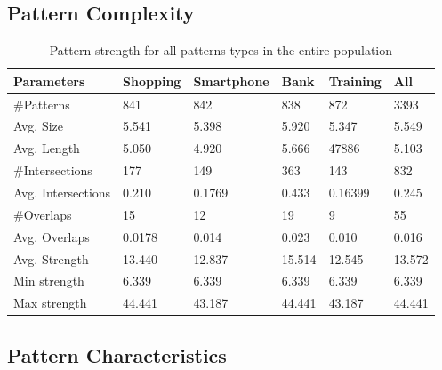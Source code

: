 	\subsection{Pattern Complexity}

		\begin{table}[H]
      \begin{tabular}{l || l | l | l | l || l}
        \hline
        {\bf Parameters} & {\bf Shopping} & {\bf Smartphone} & {\bf Bank} & {\bf Training} & {\bf All} \\ \hline
        \#Patterns & 841 & 842 & 838 & 872 & 3393 \\
        Avg. Size & 5.541 & 5.398 & 5.920 & 5.347 & 5.549 \\ 
        Avg. Length & 5.050 & 4.920 & 5.666 & 47886 & 5.103 \\
        \#Intersections & 177 & 149 & 363 & 143 & 832 \\
        Avg. Intersections & 0.210 & 0.1769 & 0.433 & 0.16399 & 0.245 \\
        \#Overlaps & 15 & 12 & 19 & 9 & 55 \\
        Avg. Overlaps & 0.0178 & 0.014 & 0.023 & 0.010 & 0.016\\ \hline
        Avg. Strength & 13.440 & 12.837 & 15.514 & 12.545 & 13.572 \\ 
        Min strength & 6.339 & 6.339 & 6.339 & 6.339 & 6.339 \\
        Max strength & 44.441 & 43.187 & 44.441 & 43.187 & 44.441 \\ \hline
      \end{tabular}
      \caption{Pattern strength for all patterns types in the entire population}
      \label{tab:patternstrength}
    \end{table}

	\subsection{Pattern Characteristics}




